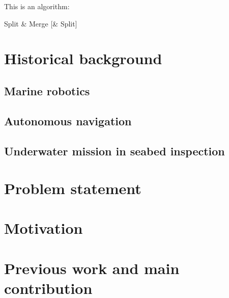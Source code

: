 This is an algorithm:
\begin{algorithm}
\label{alg:SMS}
\caption{Split \& Merge [\& Split]}
\begin{algorithmic} [1]
\ELSE
{}
\ENDIF
\ENDWHILE
{}
\end{algorithmic}
\end{algorithm}


\section{Historical background}
\subsection{Marine robotics}
\subsection{Autonomous navigation}
\subsection{Underwater mission in seabed inspection}

\section{Problem statement}
\section{Motivation}

\section{Previous work and main contribution}
